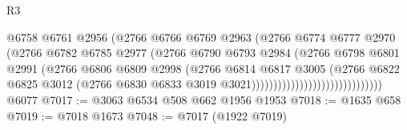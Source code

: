 \begin{lexlean}{R3}
\begin{coremodule}
                                              @6758
                                              @6761
                                              @2956
                                              (@2766
                                                @6766
                                                @6769
                                                @2963
                                                (@2766
                                                  @6774
                                                  @6777
                                                  @2970
                                                  (@2766
                                                    @6782
                                                    @6785
                                                    @2977
                                                    (@2766
                                                      @6790
                                                      @6793
                                                      @2984
                                                      (@2766
                                                        @6798
                                                        @6801
                                                        @2991
                                                        (@2766
                                                          @6806
                                                          @6809
                                                          @2998
                                                          (@2766
                                                            @6814
                                                            @6817
                                                            @3005
                                                            (@2766
                                                              @6822
                                                              @6825
                                                              @3012
                                                              (@2766
                                                                @6830
                                                                @6833
                                                                @3019
                                                                @3021))))))))))))))))))))))))))))))
    @6077
@7017 := @3063 @6534 @508 @662 @1956 @1953
@7018 := @1635 @658
@7019 := @7018 @1673
@7048 := @7017
    (@1922 @7019)

\end{coremodule}
\end{lexlean}
